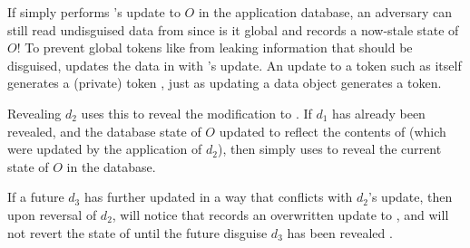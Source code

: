 If \sys simply performs 's update to $O$ in the application database, an adversary can still
read undisguised data from  since is it global and records a now-stale state of $O$!
%
%
To prevent global tokens like  from leaking information that should be disguised, \sys
updates the data in  with 's update. An update to a token such as 
itself generates a (private) token , just as updating a data object generates a token.

Revealing $d_2$ uses this  to reveal the modification to . 
If $d_1$ has already been revealed, and the database state of $O$ updated to reflect the contents
of  (which were updated by the application of $d_2$), 
then \sys simply uses  to reveal the current state of $O$ in the database. 

If a future $d_3$ has further updated  in a way that conflicts with $d_2$'s update, then
upon reversal of $d_2$, \sys will notice that  records an overwritten update to
, and will not revert the state of  until the future disguise $d_3$ has been
revealed .





